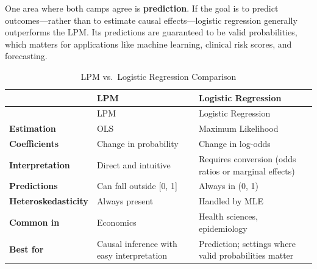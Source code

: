 \documentclass[
  letterpaper,
  DIV=11,
  numbers=noendperiod]{scrreprt}
\begin{document}
One area where both camps agree is \textbf{prediction}. If the goal is
to predict outcomes---rather than to estimate causal effects---logistic
regression generally outperforms the LPM. Its predictions are guaranteed
to be valid probabilities, which matters for applications like machine
learning, clinical risk scores, and forecasting.

\begin{longtable}[]{@{}
  >{\raggedright\arraybackslash}p{}
  >{\raggedright\arraybackslash}p{}
  >{\raggedright\arraybackslash}p{}@{}}
\caption{LPM vs.~Logistic Regression
Comparison}\label{tbl-comparison}\tabularnewline
\toprule\noalign{}
\begin{minipage}[b]{\linewidth}\raggedright
\end{minipage} & \begin{minipage}[b]{\linewidth}\raggedright
LPM
\end{minipage} & \begin{minipage}[b]{\linewidth}\raggedright
Logistic Regression
\end{minipage} \\
\midrule\noalign{}
\endfirsthead
\toprule\noalign{}
\begin{minipage}[b]{\linewidth}\raggedright
\end{minipage} & \begin{minipage}[b]{\linewidth}\raggedright
LPM
\end{minipage} & \begin{minipage}[b]{\linewidth}\raggedright
Logistic Regression
\end{minipage} \\
\midrule\noalign{}
\endhead
\bottomrule\noalign{}
\endlastfoot
\textbf{Estimation} & OLS & Maximum Likelihood \\
\textbf{Coefficients} & Change in probability & Change in log-odds \\
\textbf{Interpretation} & Direct and intuitive & Requires conversion
(odds ratios or marginal effects) \\
\textbf{Predictions} & Can fall outside {[}0, 1{]} & Always in (0, 1) \\
\textbf{Heteroskedasticity} & Always present & Handled by MLE \\
\textbf{Common in} & Economics & Health sciences, epidemiology \\
\textbf{Best for} & Causal inference with easy interpretation &
Prediction; settings where valid probabilities matter \\
\end{longtable}
\end{document}

